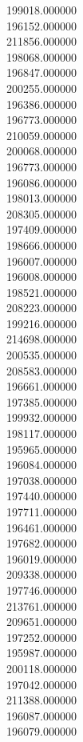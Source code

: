 199018.000000\\
196152.000000\\
211856.000000\\
198068.000000\\
196847.000000\\
200255.000000\\
196386.000000\\
196773.000000\\
210059.000000\\
200068.000000\\
196773.000000\\
196086.000000\\
198013.000000\\
208305.000000\\
197409.000000\\
198666.000000\\
196007.000000\\
196008.000000\\
198521.000000\\
208223.000000\\
199216.000000\\
214698.000000\\
200535.000000\\
208583.000000\\
196661.000000\\
197385.000000\\
199932.000000\\
198117.000000\\
195965.000000\\
196084.000000\\
197038.000000\\
197440.000000\\
197711.000000\\
196461.000000\\
197682.000000\\
196019.000000\\
209338.000000\\
197746.000000\\
213761.000000\\
209651.000000\\
197252.000000\\
195987.000000\\
200118.000000\\
197042.000000\\
211388.000000\\
196087.000000\\
196079.000000\\
